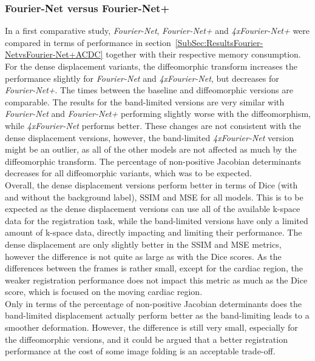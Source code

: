 \subsubsection{Fourier-Net versus Fourier-Net+} \label{SubSubSec:DiscussionFourier-NetvsFourier-Net+ACDC}
In a first comparative study, \emph{Fourier-Net}, \emph{Fourier-Net+} and \emph{4xFourier-Net+} were compared in terms of performance in section~\ref{SubSec:ResultsFourier-NetvsFourier-Net+ACDC} together with their respective memory consumption. For the dense displacement variants, the diffeomorphic transform increases the performance slightly for \emph{Fourier-Net} and \emph{4xFourier-Net}, but decreases for \emph{Fourier-Net+}. The times between the baseline and diffeomorphic versions are comparable. The results for the band-limited versions are very similar with \emph{Fourier-Net} and \emph{Fourier-Net+} performing slightly worse  with the diffeomorphism, while \emph{4xFourier-Net} performs better.  These changes are not consistent with the dense displacement versions, however, the band-limited \emph{4xFourier-Net} version might be an outlier, as all of the other models are not affected as much by the diffeomorphic transform. The percentage of non-positive Jacobian determinants decreases for all diffeomorphic variants, which was to be expected.\\
Overall, the dense displacement versions perform better in terms of Dice (with and without the background label), SSIM and MSE for all models. This is to be expected as the dense displacement versions can use all of the available k-space data for the registration task, while the band-limited versions have only a limited amount of k-space data, directly impacting and limiting their performance. The dense displacement are only slightly better in the SSIM and MSE metrics, however the difference is not quite as large as with the Dice scores. As the differences between the frames is rather small, except for the cardiac region, the weaker registration performance does not impact this metric as much as the Dice score, which is focused on the moving cardiac region.\\
Only in terms of the percentage of non-positive Jacobian determinants does the band-limited displacement actually perform better as the band-limiting leads to a smoother deformation. However, the difference is still very small, especially for the diffeomorphic versions, and it could be argued that a better registration performance at the cost of some image folding is an acceptable trade-off. \\
